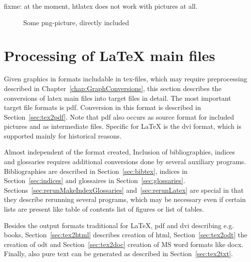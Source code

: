 \documentclass[12pt]{book}
\newcommand{\gls}[1]{#1}
\begin{document}
fixme: at the moment, htlatex does not work with pictures at all. 

\begin{figure}[htb]
\begin{center}
\end{center}
\caption{\label{fig:asIsPng}Some png-picture, directly included }
\end{figure}



\chapter{Processing of \LaTeX{} main files}\label{chap:latexMainConversions}

Given graphics in formats includable in tex-files, 
which may require preprocessing described in 
Chapter~\ref{chap:GraphConversions}, 
this section describes the conversions of latex main files 
into target files in detail. 
The most important target file formats is \gls{pdf}. 
Conversion in this format is described in Section~\ref{sec:tex2pdf}. 
Note that \gls{pdf} also occurs as source format 
for included pictures and as intermediate files. 
Specific for \LaTeX{} is the \gls{dvi} format, 
which is supported mainly for historical reasons. 

Almost independent of the format created, 
Inclusion of bibliographies, indices and glossaries 
requires additional conversions 
done by several auxiliary programs. 
Bibliographies are described in Section~\ref{sec:bibtex}, 
indices in Section~\ref{sec:indices} 
and glossaires in Section~\ref{sec:glossaries}. 
Sections~\ref{sec:rerunMakeIndexGlossaries} 
and~\ref{sec:rerunLatex} 
are special in that they describe rerunning several programs, 
which may be necessary even if certain lists are present 
like table of contents list of figures or list of tables. 


Besides the output formats traditional for \LaTeX, 
\gls{pdf} and \gls{dvi} describing e.g. books, 
Section~\ref{sec:tex2html} describes creation of 
\gls{html}, Section~\ref{sec:tex2odt} the creation of \gls{odt} and 
Section~\ref{sec:tex2doc} creation of MS word formats like \gls{docx}. 
Finally, also pure text can be generated 
as described in Section~\ref{sec:tex2txt}. 
\end{document}
